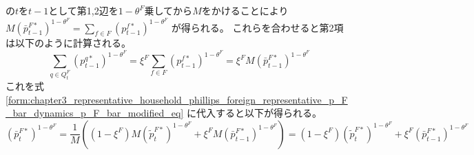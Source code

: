 の\(t\)を\(t-1\)として第1,2辺を\({1-\theta^F}\)乗してから\(M\)をかけることにより
\(M(\bar{p}_{t-1}^{F*})^{1-\theta^F}=\sum_{f\in F}(p_{t-1}^{f*})^{1-\theta^F}\)
が得られる。
これらを合わせると第2項は以下のように計算される。
\begin{equation}
\label{form:chapter3_representative_household_phillips_foreign_representative_p_F_bar_dynamics_p_F_bar_modified_second_term_eq}
    \sum_{q\in Q_t^F} (p_{t-1}^{q*})^{1-\theta^F}
    =\xi^F \sum_{f\in F} (p_{t-1}^{f*})^{1-\theta^F}
    =\xi^F M(\bar{p}_{t-1}^{F*})^{1-\theta^F}
\end{equation}
これを式
\eqref{form:chapter3_representative_household_phillips_foreign_representative_p_F_bar_dynamics_p_F_bar_modified_eq}
に代入すると以下が得られる。
\begin{equation}
\label{form:chapter3_representative_household_phillips_foreign_representative_p_F_bar_dynamics_p_F_bar_modified2_eq}
    (\bar{p}_t^{F*})^{1-\theta^F}
    =\frac{1}{M}
     \left((1-\xi^F)M(\widetilde{p}_t^{F*})^{1-\theta^F}+\xi^F M(\bar{p}_{t-1}^{F*})^{1-\theta^F}\right)
    =(1-\xi^F)(\widetilde{p}_t^{F*})^{1-\theta^F}+\xi^F(\bar{p}_{t-1}^{F*})^{1-\theta^F}
\end{equation}

